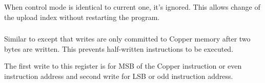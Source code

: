 \subsubsection{}

\begin{NextPort}
\end{NextPort}


\subsubsection{}

\begin{NextPort}
\end{NextPort}

When control mode is identical to current one, it's ignored. This allows change of the upload index without restarting the program.


\subsubsection{}

\begin{NextPort}
\end{NextPort}

Similar to  except that writes are only committed to Copper memory after two bytes are written. This prevents half-written instructions to be executed.

The first write to this register is for MSB of the Copper instruction or even instruction address and second write for LSB or odd instruction address.


\pagebreak
\IntentionallyEmpty
\pagebreak
